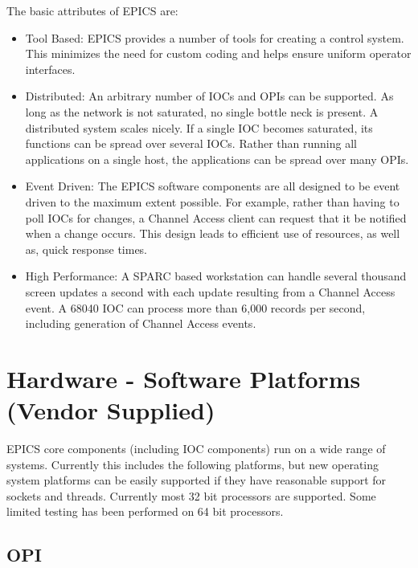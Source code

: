 The basic attributes of EPICS are:

\begin{itemize}\item Tool Based: EPICS provides a number of tools for creating a control system. This minimizes the need for custom 
coding and helps ensure uniform operator interfaces.

\item Distributed: An arbitrary number of IOCs and OPIs can be supported. As long as the network is not saturated, no 
single bottle neck is present. A distributed system scales nicely. If a single IOC becomes saturated, its functions can 
be spread over several IOCs. Rather than running all applications on a single host, the applications can be spread 
over many OPIs.

\item Event Driven: The EPICS software components are all designed to be event driven to the maximum extent 
possible. For example, rather than having to poll IOCs for changes, a Channel Access client can request that it be 
notified when a change occurs. This design leads to efficient use of resources, as well as, quick response times.

\item High Performance: A SPARC based workstation can handle several thousand screen updates a second with each 
update resulting from a Channel Access event. A 68040 IOC can process more than 6,000 records per second, 
including generation of Channel Access events. 

\end{itemize}\section{Hardware - Software Platforms (Vendor Supplied)}

EPICS core components (including IOC components) run on a wide range of systems. Currently this includes the 
following platforms, but new operating system platforms can be easily supported if they have reasonable support for 
sockets and threads. Currently most 32 bit processors are supported. Some limited testing has been performed on 64 bit 
processors.

\subsection{OPI}

